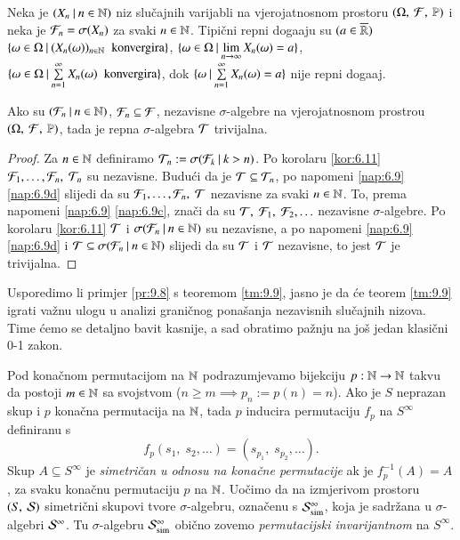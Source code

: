\begin{pr}  \label{pr:9.8}
    Neka je $({X_n} \: | \: {n \in \mathbb{N}})$ niz slu\v cajnih varijabli na vjerojatnosnom prostoru $(\Omega, \: \mathcal{F}, \: \mathbb{P})$ i neka je $\mathcal{F}_n = \sigma({X_n})$ za svaki $n \in \mathbb{N}$.
    Tipi\v cni repni doga\dj aju su $(a \in \overline{\mathbb{R}})$ $\{{\omega \in \Omega} \: | \: {(X_n(\omega))_{n \in \mathbb{N}} \; \textnormal{ konvergira}}\}$, $\{{\omega \in \Omega} \: | \: {\lim\limits_{n \to \infty} X_n(\omega) = a}\}$, $\{{\omega \in \Omega} \: | \: {\sum\limits_{n = 1}^{\infty} X_n(\omega) \; \textnormal{ konvergira}}\}$, dok $\{{\omega} \: | \: {\sum\limits_{n = 1}^{\infty} X_n (\omega) = a}\}$ nije repni doga\dj aj.
\end{pr}

\begin{tm}  \label{tm:9.9}
    Ako su $({\mathcal{F}_n} \: | \: {n \in \mathbb{N}})$, $\mathcal{F}_n \subseteq \mathcal{F}$, nezavisne $\sigma$-algebre na vjerojatnosnom prostrou $(\Omega, \: \mathcal{F}, \: \mathbb{P})$, tada je repna $\sigma$-algebra $\mathcal{T}$ trivijalna.
\end{tm}

\begin{proof}
    Za $n \in \mathbb{N}$ definiramo $\mathcal{T}_n := \sigma({\mathcal{F}_k} \: | \: {k > n})$.
    Po korolaru \ref{kor:6.11} $\mathcal{F}_1, \ldots, \mathcal{F}_n, \; \mathcal{T}_n$ su nezavisne.
    Budu\' ci da je $\mathcal{T} \subseteq \mathcal{T}_n$, po napomeni \ref{nap:6.9} \ref{nap:6.9d} slijedi da su $\mathcal{F}_1, \ldots, \mathcal{F}_n, \; \mathcal{T}$ nezavisne za svaki $n \in \mathbb{N}$.
    To, prema napomeni \ref{nap:6.9} \ref{nap:6.9c}, zna\v ci da su $\mathcal{T}, \; \mathcal{F}_1, \; \mathcal{F}_2, \ldots$ nezavisne $\sigma$-algebre.
    Po korolaru \ref{kor:6.11} $\mathcal{T}$ i $\sigma({\mathcal{F}_n} \: | \: {n \in \mathbb{N}})$ su nezavisne, a po napomeni \ref{nap:6.9} \ref{nap:6.9d} i $\mathcal{T} \subseteq \sigma({\mathcal{F}_n} \: | \: {n \in \mathbb{N}})$ slijedi da su $\mathcal{T}$ i $\mathcal{T}$ nezavisne, to jest $\mathcal{T}$ je trivijalna.
\end{proof}

Usporedimo li primjer \ref{pr:9.8} s teoremom \ref{tm:9.9}, jasno je da \' ce teorem \ref{tm:9.9} igrati va\v znu ulogu u analizi grani\v cnog pona\v sanja nezavisnih slu\v cajnih nizova.
Time \' cemo se detaljno bavit kasnije, a sad obratimo pa\v znju na jo\v s jedan klasi\v cni 0-1 zakon.

Pod kona\v cnom permutacijom na $\mathbb{N}$ podrazumjevamo bijekciju $p: \mathbb{N} \to \mathbb{N}$ takvu da postoji $m \in \mathbb{N}$ sa svojstvom ($n \geq m \implies p_n := p(n) = n$).
Ako je $S$ neprazan skup i $p$ kona\v cna permutacija na $\mathbb{N}$, tada $p$ inducira permutaciju $f_p$ na $S^\infty$ definiranu s
\begin{equation*}
    f_p (s_1, \; s_2, \ldots) = (s_{p_1}, \; s_{p_2}, \ldots).
\end{equation*}
Skup $A \subseteq S^\infty$ je \emph{simetri\v can u odnosu na kona\v cne permutacije} ak je $f_p^{-1} (A) = A$, za svaku kona\v cnu permutaciju $p$ na $\mathbb{N}$.
Uo\v cimo da na izmjerivom prostoru $({S}, \: {\mathcal{S}})$ simetri\v cni skupovi tvore $\sigma$-algebru, ozna\v cenu s $\mathcal{S}_{\mathrm{sim}}^\infty$, koja je sadr\v zana u $\sigma$-algebri $\mathcal{S}^\infty$.
Tu $\sigma$-algebru $\mathcal{S}_{\mathrm{sim}}^{\infty}$ obi\v cno zovemo \emph{permutacijski invarijantnom} na $S^\infty$.

